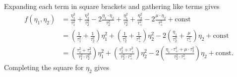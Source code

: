 \documentclass[11pt, oneside]{article}
\begin{document}
Expanding each term in square brackets and gathering like terms gives
%
\begin{align*}
f(\eta_{1}, \eta_{2})
&=
\frac{ \eta_{1}^{2} }{ \tau_{1}^{2} } 
+ \frac{ \eta_{2}^{2} }{ \tau_{2}^{2} } 
- 2 \frac{ \eta_{1} \cdot \eta_{2} }{ \tau_{2}^{2} } 
+ \frac{ \eta_{1}^{2} }{ \tau_{2}^{2} } 
+ \frac{ \eta_{2}^{2} }{ \tau_{+}^{2} } 
- 2 \frac{ \mu \cdot \eta_{2} }{ \tau_{+}^{2} } 
+ \mathrm{const}
\\
&=
\left( \frac{ 1 }{ \tau_{1}^{2} } + \frac{ 1 }{ \tau_{2}^{2} } \right) \eta_{1}^{2} 
+ \left( \frac{ 1 }{ \tau_{2}^{2} } + \frac{ 1 }{ \tau_{+}^{2} } \right) \eta_{2}^{2}
- 2 \left( \frac{ \eta_{1} }{ \tau_{2}^{2} } + \frac{ \mu }{ \tau_{+}^{2} } \right) \eta_{2} 
+ \mathrm{const}
\\
&=
\left( \frac{ \tau_{1}^{2} + \tau_{2}^{2} }{ \tau_{1}^{2} \cdot \tau_{2}^{2} } \right) \eta_{1}^{2}
+ \left( \frac{ \tau_{2}^{2} + \tau_{+}^{2} }{ \tau_{2}^{2} \cdot \tau_{+}^{2} } \right) \eta_{2}^{2}
- 2 \left( \frac{ \eta_{1} \cdot \tau_{+}^{2} + \mu \cdot \tau_{2}^{2} }{ \tau_{2}^{2} \cdot \tau_{+}^{2} } \right) \eta_{2}
+ \mathrm{const}.
\end{align*}
%
Completing the square for $\eta_{2}$ gives
%
\end{document}
